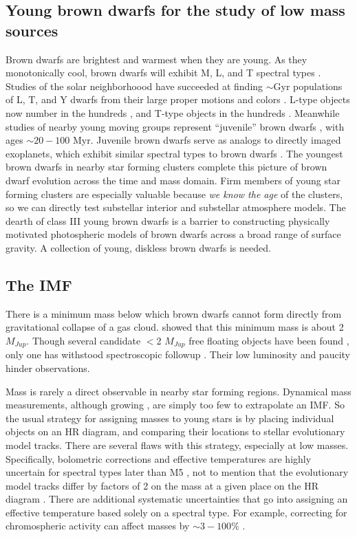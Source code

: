 \subsection{Young brown dwarfs for the study of low mass sources}
Brown dwarfs are brightest and warmest when they are young.  As they monotonically cool, brown dwarfs will exhibit M, L, and T spectral types \citep{2012ApJS..201...19D}.  Studies of the solar neighborhoood have succeeded at finding $\sim$Gyr populations of L, T, and Y dwarfs from their large proper motions and colors \citep{2011ApJS..197...19K}.  L-type objects now number in the hundreds \citep{2010AJ....139.1808S}, and T-type objects in the hundreds \citep{2011ApJS..197...19K}.  Meanwhile studies of nearby young moving groups represent ``juvenile'' brown dwarfs \citep{2013ApJ...772...79A}, with ages $\sim20-100$ Myr.  Juvenile brown dwarfs serve as analogs to directly imaged exoplanets, which exhibit similar spectral types to brown dwarfs \citep{2015ApJ...798L...3C}.  The youngest brown dwarfs in nearby star forming clusters complete this picture of brown dwarf evolution across the time and mass domain.  Firm members of young star forming clusters are especially valuable because \emph{we know the age} of the clusters, so we can directly test substellar interior and substellar atmosphere models.  The dearth of class III young brown dwarfs is a barrier to constructing physically motivated photospheric models of brown dwarfs across a broad range of surface gravity.  A collection of young, diskless brown dwarfs is needed.

\subsection{The IMF}

There is a minimum mass below which brown dwarfs cannot form directly from gravitational collapse of a gas cloud.  \citet{1976MNRAS.176..483R} showed that this minimum mass is about 2 $M_{Jup}$.  Though several candidate $<$2 $M_{Jup}$ free floating objects have been found \citep{2015A&A...574A.118P}, only one has withstood spectroscopic followup \citep{2010ApJ...709L.158M}.  Their low luminosity and paucity hinder observations.

Mass is rarely a direct observable in nearby star forming regions.  Dynamical mass measurements, although growing \citep{2010ApJ...721.1725D}, are simply too few to extrapolate an IMF.  So the usual strategy for assigning masses to young stars is by placing individual objects on an HR diagram, and comparing their locations to stellar evolutionary model tracks.  There are several flaws with this strategy, especially at low masses.  Specifically, bolometric corrections and effective temperatures are highly uncertain for spectral types later than M5 \citep{2013ApJS..208....9P}, not to mention that the evolutionary model tracks differ by factors of 2 on the mass at a given place on the HR diagram \citep{1994ApJS...90..467D,1998A&A...337..403B}.  There are additional systematic uncertainties that go into assigning an effective temperature based solely on a spectral type.  For example, correcting for chromospheric activity can affect masses by $\sim3-100\%$ \citep{2014ApJ...796..119S}.

